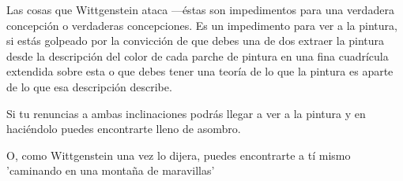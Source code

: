   Las cosas que Wittgenstein ataca ---éstas son impedimentos para una verdadera
  concepción o verdaderas concepciones.
Es un impedimento para ver a la pintura, 
si estás golpeado por la convicción de que debes una de dos
extraer la pintura desde la descripción del color de cada parche de pintura en una fina cuadrícula extendida sobre esta 
o que 
debes tener una teoría de lo que la pintura es aparte de lo que esa descripción describe.

Si tu renuncias a ambas inclinaciones podrás llegar a ver a la pintura y en haciéndolo puedes encontrarte lleno de asombro. 

O, como Wittgenstein una vez lo dijera, puedes encontrarte a tí mismo 'caminando en una montaña de maravillas'





